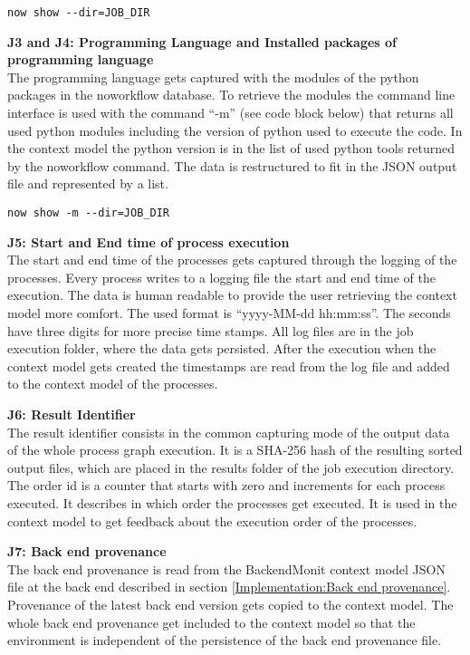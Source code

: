 \documentclass[draft,final]{vutinfth} %
\begin{document}
\begin{lstlisting}[frame=single]
now show --dir=JOB_DIR
\end{lstlisting}

\textbf{J3 and J4: Programming Language and  Installed packages of programming language} \\
The programming language gets captured with the modules of the python packages in the noworkflow database. To retrieve the modules the command line interface is used with the command “-m” (see code block below) that returns all used python modules including the version of python used to execute the code. In the context model the python version is in the list of used python tools returned by the noworkflow command. The data is restructured to fit in the JSON output file and represented by a list. 

\begin{lstlisting}[frame=single]
now show -m --dir=JOB_DIR
\end{lstlisting}

\textbf{J5: Start and End time of process execution} \\
The start and end time of the processes gets captured through the logging of the processes. Every process writes to a logging file the start and end time of the execution. The data is human readable to provide the user retrieving the context model more comfort. The used format is “yyyy-MM-dd hh:mm:ss”. The seconds have three digits for more precise time stamps. All log files are in the job execution folder, where the data gets persisted. After the execution when the context model gets created the timestamps are read from the log file and added to the context model of the processes.  

\textbf{J6: Result Identifier} \\
The result identifier consists in the common capturing mode of the output data of the whole process graph execution. It is a SHA-256 hash of the resulting sorted output files, which are placed in the results folder of the job execution directory. The order id is a counter that starts with zero and increments for each process executed. It describes in which order the processes get executed. It is used in the context model to get feedback about the execution order of the processes.

\textbf{J7: Back end provenance} \\
The back end provenance is read from the BackendMonit context model JSON file at the back end described in section \ref{Implementation:Back end provenance}. Provenance of the latest back end version gets copied to the context model. The whole back end provenance get included to the context model so that the environment is independent of the persistence of the back end provenance file. 
\end{document}
